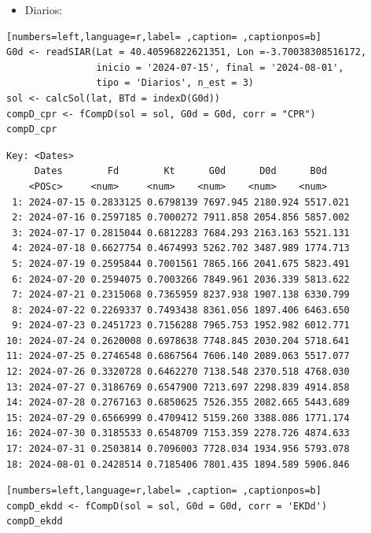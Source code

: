 \begin{itemize}
\begin{itemize}
\item Diarios:
\end{itemize}
\begin{lstlisting}[numbers=left,language=r,label= ,caption= ,captionpos=b]
G0d <- readSIAR(Lat = 40.40596822621351, Lon =-3.70038308516172,
                inicio = '2024-07-15', final = '2024-08-01',
                tipo = 'Diarios', n_est = 3)
sol <- calcSol(lat, BTd = indexD(G0d))
compD_cpr <- fCompD(sol = sol, G0d = G0d, corr = "CPR")
compD_cpr
\end{lstlisting}

\begin{verbatim}
Key: <Dates>
	 Dates        Fd        Kt      G0d      D0d      B0d
	<POSc>     <num>     <num>    <num>    <num>    <num>
 1: 2024-07-15 0.2833125 0.6798139 7697.945 2180.924 5517.021
 2: 2024-07-16 0.2597185 0.7000272 7911.858 2054.856 5857.002
 3: 2024-07-17 0.2815044 0.6812283 7684.293 2163.163 5521.131
 4: 2024-07-18 0.6627754 0.4674993 5262.702 3487.989 1774.713
 5: 2024-07-19 0.2595844 0.7001561 7865.166 2041.675 5823.491
 6: 2024-07-20 0.2594075 0.7003266 7849.961 2036.339 5813.622
 7: 2024-07-21 0.2315068 0.7365959 8237.938 1907.138 6330.799
 8: 2024-07-22 0.2269337 0.7493438 8361.056 1897.406 6463.650
 9: 2024-07-23 0.2451723 0.7156288 7965.753 1952.982 6012.771
10: 2024-07-24 0.2620008 0.6978638 7748.845 2030.204 5718.641
11: 2024-07-25 0.2746548 0.6867564 7606.140 2089.063 5517.077
12: 2024-07-26 0.3320728 0.6462270 7138.548 2370.518 4768.030
13: 2024-07-27 0.3186769 0.6547900 7213.697 2298.839 4914.858
14: 2024-07-28 0.2767163 0.6850625 7526.355 2082.665 5443.689
15: 2024-07-29 0.6566999 0.4709412 5159.260 3388.086 1771.174
16: 2024-07-30 0.3185533 0.6548709 7153.359 2278.726 4874.633
17: 2024-07-31 0.2503814 0.7096003 7728.034 1934.956 5793.078
18: 2024-08-01 0.2428514 0.7185406 7801.435 1894.589 5906.846
\end{verbatim}

\begin{lstlisting}[numbers=left,language=r,label= ,caption= ,captionpos=b]
compD_ekdd <- fCompD(sol = sol, G0d = G0d, corr = 'EKDd')
compD_ekdd
\end{lstlisting}


\end{itemize}
